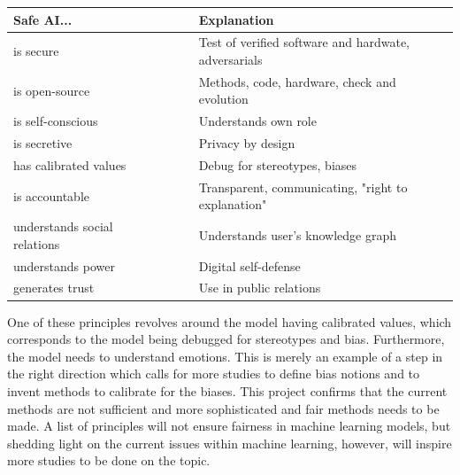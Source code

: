 \documentclass[11pt, fleqn, titlepage]{article}
\begin{document}
	
	\begin{table}[H]
		\centering
		\begin{tabular}{l  l  l  l  l}
			\toprule
			Safe AI...                  & & & & Explanation \\ \midrule
			is secure                      & & & & Test of verified software and hardwate, adversarials \\
			is open-source                 & & & & Methods, code, hardware, check and evolution         \\
			is self-conscious              & & & & Understands own role                                 \\
			is secretive                   & & & & Privacy by design                                    \\
			has calibrated values       & & & & Debug for stereotypes, biases                        \\
			is accountable              & & & & Transparent, communicating, "right to explanation"   \\
			understands social relations & & & & Understands user's knowledge graph                   \\
			understands power           & & & & Digital self-defense                                 \\
			generates trust             & & & & Use in public relations                              \\ \bottomrule
		\end{tabular}
	\end{table} 
	\noindent
	One of these principles revolves around the model having calibrated values, which corresponds to the model being debugged for stereotypes and bias. Furthermore, the model needs to understand emotions. This is merely an example of a step in the right direction which calls for more studies to define bias notions and to invent methods to calibrate for the biases. This project confirms that the current methods are not sufficient and more sophisticated and fair methods needs to be made. A list of principles will not ensure fairness in machine learning models, but shedding light on the current issues within machine learning, however, will inspire more studies to be done on the topic.
	

	
\end{document}
